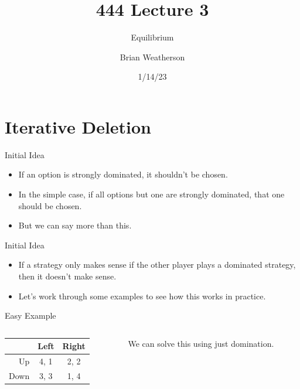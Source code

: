 \documentclass[
  14pt,
  letterpaper,
  ignorenonframetext,
  aspectratio=169,
]{beamer}
\title{444 Lecture 3}
\subtitle{Equilibrium}
\author{Brian Weatherson}
\date{1/14/23}
\providecommand{\tightlist}{%
  \setlength{\itemsep}{0pt}\setlength{\parskip}{0pt}}\usepackage{longtable,booktabs,array}
\let\olditem\item
\renewcommand{\item}{%
\olditem\vspace{6pt}}
\begin{document}
\frame{\titlepage}
\ifdefined\Shaded\renewenvironment{Shaded}{\begin{tcolorbox}[borderline west={3pt}{0pt}{shadecolor}, enhanced, sharp corners, frame hidden, interior hidden, breakable, boxrule=0pt]}{\end{tcolorbox}}\fi

\hypertarget{iterative-deletion}{%
\section{Iterative Deletion}\label{iterative-deletion}}

\begin{frame}{Initial Idea}
\protect\hypertarget{initial-idea}{}
\begin{itemize}[<+->]
\tightlist
\item
  If an option is strongly dominated, it shouldn't be chosen.
\item
  In the simple case, if all options but one are strongly dominated,
  that one should be chosen.
\item
  But we can say more than this.
\end{itemize}
\end{frame}

\begin{frame}{Initial Idea}
\protect\hypertarget{initial-idea-1}{}
\begin{itemize}[<+->]
\tightlist
\item
  If a strategy only makes sense if the other player plays a dominated
  strategy, then it doesn't make sense.
\item
  Let's work through some examples to see how this works in practice.
\end{itemize}
\end{frame}

\begin{frame}{Easy Example}
\protect\hypertarget{easy-example}{}
\begin{columns}[T]
\begin{column}{0.4\textwidth}
\begin{table}[!h]
\centering
\begin{tabular}[t]{>{}r|cc}
\toprule
 & Left & Right\\
\midrule
Up & 4, 1 & 2, 2\\
Down & 3, 3 & 1, 4\\
\bottomrule
\end{tabular}
\end{table}
\end{column}

\begin{column}{0.6\textwidth}
We can solve this using just domination.
\end{column}
\end{columns}
\end{frame}
\end{document}
